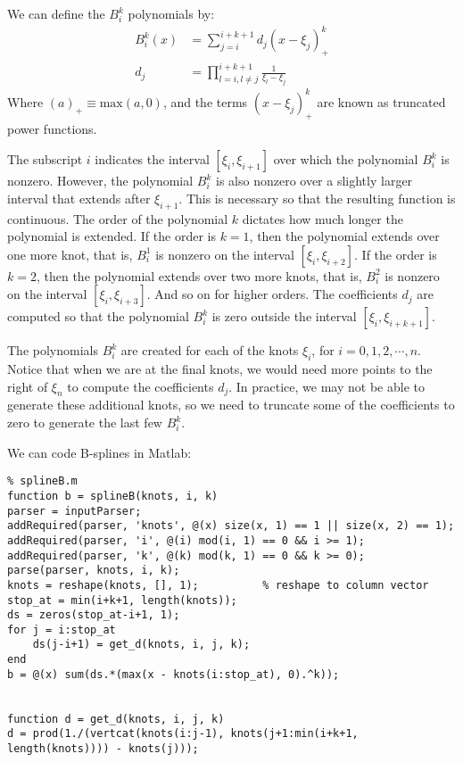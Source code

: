\documentclass[12pt, a4paper]{article}
\begin{document}
We can define the \(B_i^k\) polynomials by:
\begin{align*}
B_i^k(x) &= \sum_{j=i}^{i+k+1}d_j(x-\xi_j)_{+}^k\\
d_j&=  \prod_{l=i,l\neq j}^{i+k+1}\frac{1}{\xi_l-\xi_j}
\end{align*}
Where \((a)_{+ }\equiv\text{max}(a, 0)\), and the terms \((x-\xi_j)_{+}^k\) are known as truncated power functions.

The subscript \(i\) indicates the interval \([\xi_i, \xi_{i+1}]\) over which the polynomial \(B_i^k\) is nonzero.
However, the polynomial \(B_i^k\) is also nonzero over a slightly larger interval that extends after \(\xi_{i+1}\).
This is necessary so that the resulting function is continuous.
The order of the polynomial \(k\) dictates how much longer the polynomial is extended.
If the order is \(k=1\), then the polynomial extends over one more knot, that is, \(B_i^1\) is nonzero on the interval \([\xi_i, \xi_{i+2}]\).
If the order is \(k=2\), then the polynomial extends over two more knots, that is, \(B_i^2\) is nonzero on the interval \([\xi_i, \xi_{i+3}]\).
And so on for higher orders.
The coefficients \(d_j\) are computed so that the polynomial \(B_i^k\) is zero outside the interval \([\xi_i, \xi_{i+k+1}]\).

The polynomials \(B_i^k\) are created for each of the knots \(\xi_i\), for \(i=0,1,2,\cdots,n\).
Notice that when we are at the final knots, we would need more points to the right of \(\xi_n\) to compute the coefficients \(d_j\).
In practice, we may not be able to generate these additional knots, so we need to truncate some of the coefficients to zero to generate the last few \(B_i^k\).

We can code B-splines in Matlab:
\lstset{language=matlab,label= ,caption= ,captionpos=b,firstnumber=1,numbers=left,style=Matlab-editor}
\begin{lstlisting}
% splineB.m
function b = splineB(knots, i, k)
parser = inputParser;
addRequired(parser, 'knots', @(x) size(x, 1) == 1 || size(x, 2) == 1);
addRequired(parser, 'i', @(i) mod(i, 1) == 0 && i >= 1);
addRequired(parser, 'k', @(k) mod(k, 1) == 0 && k >= 0);
parse(parser, knots, i, k);
knots = reshape(knots, [], 1);          % reshape to column vector
stop_at = min(i+k+1, length(knots));
ds = zeros(stop_at-i+1, 1);
for j = i:stop_at
    ds(j-i+1) = get_d(knots, i, j, k);
end
b = @(x) sum(ds.*(max(x - knots(i:stop_at), 0).^k));


function d = get_d(knots, i, j, k)
d = prod(1./(vertcat(knots(i:j-1), knots(j+1:min(i+k+1, length(knots)))) - knots(j)));
\end{lstlisting}
\end{document}
